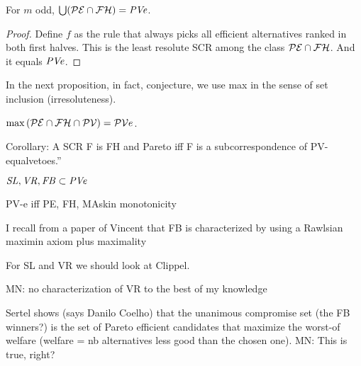 \documentclass[version=3.21, pagesize, twoside=off, bibliography=totoc, DIV=calc, fontsize=12pt, a4paper]{scrartcl}
\begin{document}


\begin{proposition}
	For $m$ odd, $\bigcup(\mathcal{PE} \cap \mathcal{FH}) = \mathit{PVe}$.
\end{proposition}
\begin{proof}
	Define $f$ as the rule that always picks all efficient alternatives ranked in both first halves. This is the least resolute SCR among the class $\mathcal{PE} \cap \mathcal{FH}$. And it equals $\mathit{PVe}$.
\end{proof}

In the next proposition, in fact, conjecture, we use max in the sense of set inclusion (irresoluteness).
\begin{proposition}
	$\max {(\mathcal{PE}\cap \mathcal{FH}\cap \mathcal{PV})} = \mathcal{PV}e$.
\end{proposition}

Corollary: A SCR F is FH and Pareto iff F is a subcorrespondence of PV-equalvetoes.”





\begin{proposition}
	$\mathit{SL}, \mathit{VR}, \mathit{FB} \subset \mathit{PVe}$
\end{proposition}



PV-e iff PE, FH, MAskin monotonicity

I recall from a paper of Vincent that FB is characterized by using a Rawlsian maximin axiom plus maximality 

For SL and VR we should look at Clippel. 

\color{green} MN: no characterization of VR to the best of my knowledge \color{black}

Sertel shows (says Danilo Coelho) that the unanimous compromise set (the FB winners?) is the set of Pareto efficient candidates that maximize the worst-of welfare (welfare = nb alternatives less good than the chosen one). \color{green} MN: This is true, right? \color{black}
\end{document}
